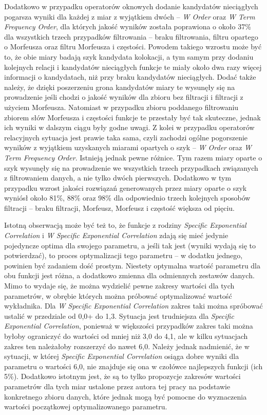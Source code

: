 \documentclass[11pt,a4paper]{llncs}
\begin{document}
\par
Dodatkowo w przypadku operatorów oknowych dodanie kandydatów nieciągłych pogarsza wyniki dla każdej z miar z wyjątkiem dwóch -- \emph{W Order} oraz \emph{W Term Frequency Order}, dla których jakość wyników została poprawiona o około 37\% dla wszystkich trzech przypadków filtrowania -- braku filtrowania, filtru opartego o Morfeusza oraz filtru Morfeusza i częstości.
Powodem takiego wzrostu może być to, że obie miary badają szyk kandydata kolokacji, a tym samym przy dodaniu kolejnych relacji i kandydatów nieciągłych funkcje te miały około dwa razy więcej informacji o kandydatach, niż przy braku kandydatów nieciągłych.
Dodać także należy, że dzięki poszerzeniu grona kandydatów miary te wysunęły się na prowadzenie jeśli chodzi o jakość wyników dla zbioru bez filtracji i filtracji z użyciem Morfeusza.
Natomiast w przypadku zbioru poddanego filtrowaniu zbiorem słów Morfeusza i częstości funkcje te przestały być tak skuteczne, jednak ich wyniki w dalszym ciągu były godne uwagi.
Z kolei w przypadku operatorów relacyjnych sytuacja jest prawie taka sama, czyli zachodzi ogólne pogorszenie wyników z wyjątkiem uzyskanych miarami opartych o szyk -- \emph{W Order} oraz \emph{W Term Frequency Order}.
Istnieją jednak pewne różnice.
Tym razem miary oparte o szyk wysunęły się na prowadzenie we wszystkich trzech przypadkach związanych z filtrowaniem danych, a nie tylko dwóch pierwszych.
Dodatkowo w tym przypadku wzrost jakości rozwiązań generowanych przez miary oparte o szyk wyniósł około 81\%, 88\% oraz 98\% dla odpowiednio trzech kolejnych sposobów filtracji -- braku filtracji, Morfeusz, Morfeusz i częstość większa od pięciu.

\par
Istotną obserwacją może być też to, że funkcje z rodziny \emph{Specific Exponential Correlation} i \emph{W Specific Exponential Correlation} zdają się mieć jedynie pojedyncze optima dla swojego parametru, a jeśli tak jest (wyniki wydają się to potwierdzać), to proces optymalizacji tego parametru -- w dodatku jednego, powinien być zadaniem dość prostym.
Niestety optymalna wartość parametru dla obu funkcji jest różna, a dodatkowo zmienna dla odmiennych zestawów danych.
Mimo to wydaje się, że można wydzielić pewne zakresy wartości dla tych parametrów, w obrębie których można próbować optymalizować wartość wykładnika.
Dla \emph{W Specific Exponential Correlation} zakres taki można spróbować ustalić w przedziale od 0,0+ do 1,3.
Sytuacja jest trudniejsza dla \emph{Specific Exponential Correlation}, ponieważ w większości przypadków zakres taki można byłoby ograniczyć do wartości od mniej niż 3,0 do 4,1, ale w kilku sytuacjach zakres ten należałoby rozszerzyć do nawet 6,0.
Należy jednak nadmienić, że w sytuacji, w której \emph{Specific Exponential Correlation} osiąga dobre wyniki dla parametru o wartości 6,0, nie znajduje się ona w czołówce najlepszych funkcji (ich 5\%).
Dodatkowo istotnym jest, że są to tylko propozycje zakresów wartości parametrów dla tych miar ustalone przez autora tej pracy na podstawie konkretnego zbioru danych, które jednak mogą być pomocne do wyznaczenia wartości początkowej optymalizowanego parametru.
\end{document}
